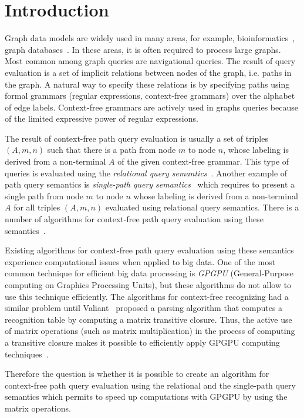 \section{Introduction}
Graph data models are widely used in many areas, for example, bioinformatics~\cite{Bio}, graph databases~\cite{graphDB}. In these areas, it is often required to process large graphs. Most common among graph queries are navigational queries. The result of query evaluation is a set of implicit relations between nodes of the graph, i.e. paths in the graph. A natural way to specify these relations is by specifying paths using formal grammars (regular expressions, context-free grammars) over the alphabet of edge labels. Context-free grammars are actively used in graphs queries because of the limited expressive power of regular expressions. 

The result of context-free path query evaluation is usually a set of triples $(A, m, n)$ such that there is a path from node $m$ to node $n$, whose labeling is derived from a non-terminal $A$ of the given context-free grammar. This type of queries is evaluated using the \textit{relational query semantics}~\cite{hellingsRelational}. Another example of path query semantics is \textit{single-path query semantics}~\cite{hellingsPathQuerying} which requires to present a single path from node $m$ to node $n$ whose labeling is derived from a non-terminal $A$ for all triples $(A, m, n)$ evaluated using relational query semantics. There is a number of algorithms for context-free path query evaluation using these semantics~\cite{GLL, hellingsRelational, RDF}.

Existing algorithms for context-free path query evaluation using these semantics experience computational issues when applied to big data. One of the most common technique for efficient big data processing is \textit{GPGPU} (General-Purpose computing on Graphics Processing Units), but these algorithms do not allow to use this technique efficiently. The algorithms for context-free recognizing had a similar problem until Valiant~\cite{valiant} proposed a parsing algorithm that computes a recognition table by computing a matrix transitive closure. Thus, the active use of matrix operations (such as matrix multiplication) in the process of computing a transitive closure makes it possible to efficiently apply GPGPU computing techniques~\cite{matricesOnGPGPU}.

Therefore the question is whether it is possible to create an algorithm for context-free path query evaluation using the relational and the single-path query semantics which permits to speed up computations with GPGPU by using the matrix operations.

